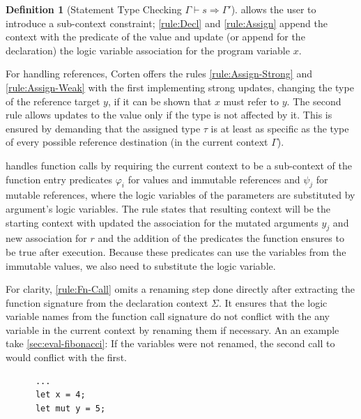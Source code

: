 \documentclass[twoside, english, final]{sdqthesis}
\theoremstyle{definition}
\newtheorem{definition}[theorem]{Definition}
\begin{document}
\begin{definition}[Statement Type Checking $\Gamma \vdash s \Rightarrow \Gamma'$]
 allows the user to introduce a sub-context constraint; \cref{rule:Decl} and \cref{rule:Assign} append the context with the predicate of the value and update (or append for the declaration) the logic variable association for the program variable $x$. 

For handling references, Corten offers the rules \cref{rule:Assign-Strong} and \cref{rule:Assign-Weak} with the first implementing 
strong updates, changing the type of the reference target $y$, if it can be shown that $x$ must refer to $y$. 
The second rule allows updates to the value only if the type is not affected by it. This is ensured by demanding that the assigned type $\tau$ is at least as specific as the type of every possible reference destination (in the current context $\Gamma$).


 handles function calls by requiring the current context to be a sub-context of the function entry predicates $\varphi_i$ for values and immutable references and $\psi_j$ for mutable references, where the logic variables of the parameters are substituted by argument's logic variables. 
The rule states that resulting context will be the starting context with updated the association for the mutated arguments $y_j$ and new association for $r$ and the addition of the predicates the function ensures to be true after execution. Because these predicates can use the variables from the immutable values, we also need to substitute the logic variable.

For clarity, \cref{rule:Fn-Call} omits a renaming step done directly after extracting the function signature from the declaration context $\Sigma$. It ensures that the logic variable names from the function call signature do not conflict with the any variable in the current context by renaming them if necessary. An an example take \cref{sec:eval-fibonacci}: If the variables were not renamed, the second call to  would conflict with the first.


\begin{listing}[h]
  \begin{minipage}[t]{0.48\linewidth}
    \begin{verbatim}
      ...
      let x = 4;
      let mut y = 5;
      

\end{verbatim}
\end{minipage}
\end{listing}
\end{definition}
\end{document}
